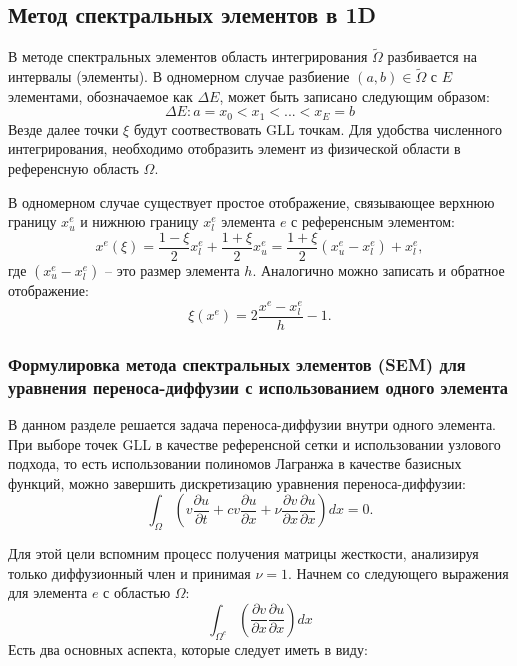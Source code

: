 \subsection{Метод спектральных элементов в 1D}
%
В методе спектральных элементов область интегрирования $\widetilde{\Omega}$ разбивается на интервалы (элементы). 
%
В одномерном случае разбиение $(a, b) \in \widetilde{\Omega}$  с $E$ элементами, обозначаемое как $\Delta E$, 
может быть записано следующим образом:
%
\begin{equation*}
    \Delta E: a = x_0 < x_1 < ... < x_E = b
\end{equation*}
%
Везде далее точки $\xi$ будут соотвествовать GLL точкам.
%
Для удобства численного интегрирования, необходимо отобразить элемент из физической области в 
референсную область $\Omega$.

%
В одномерном случае существует простое отображение, связывающее верхнюю границу $x^e_u$ 
и нижнюю границу $x^e_l$ элемента $e$ с референсным элементом:
%
\begin{equation*}
    x^e(\xi) = \frac{1-\xi}{2}x^e_l + \frac{1+\xi}{2}x^e_u = \frac{1+\xi}{2}(x^e_u-x^e_l) + x^e_l,
\end{equation*}
%
где $(x^e_u - x^e_l)$ -- это размер элемента $h$.
%
Аналогично можно записать и обратное отображение:
%
\begin{equation*}
    \xi(x^e)=2\frac{x^e - x^e_l}{h} - 1.
\end{equation*}

\subsubsection{Формулировка метода спектральных элементов (SEM) для уравнения переноса-диффузии 
с использованием одного элемента}
%
В данном разделе решается задача переноса-диффузии внутри одного элемента. 
%
При выборе точек GLL в качестве референсной сетки и использовании узлового подхода, 
то есть использовании полиномов Лагранжа в качестве базисных функций, 
можно завершить дискретизацию уравнения переноса-диффузии:
%
\begin{equation}\label{sem:ad}
    \int_\Omega (v\frac{\partial u}{\partial t} + cv \frac{\partial u}{\partial x} 
    + \nu \frac{\partial v}{\partial x} \frac{\partial u}{\partial x})dx = 0.
\end{equation}
%

Для этой цели вспомним процесс получения матрицы жесткости, 
анализируя только диффузионный член и принимая $\nu = 1$. 
%
Начнем со следующего выражения для элемента $e$ с областью $\Omega$:
\begin{equation*}
    \int_{\Omega^e} (\frac{\partial v}{\partial x} \frac{\partial u}{\partial x})dx 
\end{equation*}
%
Есть два основных аспекта, которые следует иметь в виду:
%

